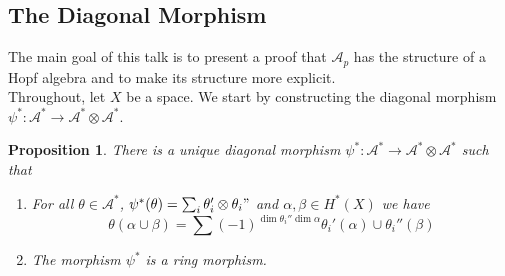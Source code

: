\documentclass[11pt, a4paper]{article}
\newtheorem{propo}[thm]{Proposition}
\theoremstyle{plain}
\begin{document}
\subsection{The Diagonal Morphism}
The main goal of this talk is to present a proof that $\mathcal{A}_p$ has the structure of a Hopf algebra and to make its structure more explicit.\\
Throughout, let $X$ be a space.
We start by constructing the diagonal morphism $\psi^{\ast}\colon \mathcal{A}^{\ast} \to \mathcal{A}^{\ast} \otimes \mathcal{A}^{\ast}$.
\begin{propo}
	There is a unique diagonal morphism $\psi^{\ast}\colon \mathcal{A}^{\ast} \to  \mathcal{A}^{\ast} \otimes \mathcal{A}^{\ast}$ such that
	\begin{enumerate}
		\item For all $\theta \in  \mathcal{A}^{\ast}$, $\psi^{\ast}( \theta) = \sum_i \theta_i' \otimes \theta_i"$ and $\alpha,\beta \in H^{\ast}( X) $  we have
			\[ 
			\theta( \alpha\cup \beta) = \sum ( -1) ^{\dim \theta_i''\dim \alpha}\theta_i'( \alpha) \cup \theta_i''( \beta) 
			\]
			
	\item The morphism $\psi^{\ast}$ is a ring morphism.
	\end{enumerate}
\end{propo}
\end{document}
